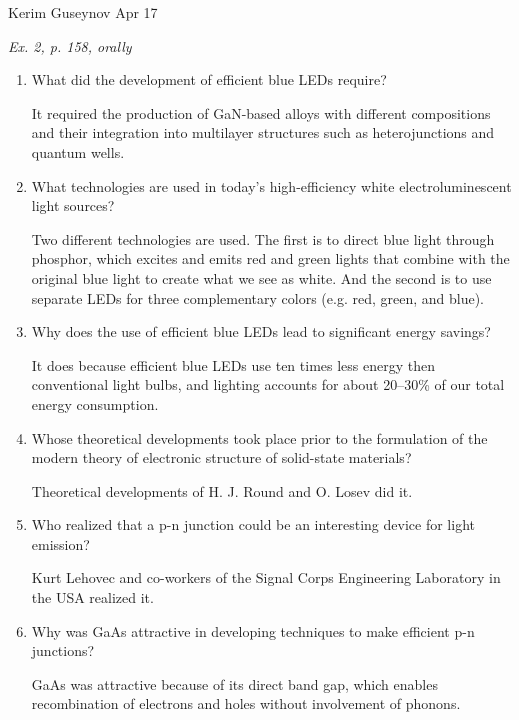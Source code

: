 \documentclass[a4paper, 12pt]{article}
\begin{document}
\noindent
Kerim Guseynov
\hfill
Apr 17

\begin{center}
	\textit{Ex. 2, p. 158, orally}
\end{center}

\begin{enumerate}[label=\alph*)]
	\item What did the development of efficient blue LEDs require?

		It required the production of GaN-based alloys with different 
		compositions and their integration into multilayer structures such 
		as heterojunctions and quantum wells.

	\item What technologies are used in today's high-efficiency white electroluminescent light sources?

		Two different technologies are used. The first is to direct blue 
		light through phosphor, which excites and emits red and green lights 
		that combine with the original blue light to create what we see as 
		white. And the second is to use separate LEDs for three 
		complementary colors (e.g. red, green, and blue).

	\item Why does the use of efficient blue LEDs lead to significant energy savings?

		It does because efficient blue LEDs use ten times less energy then 
		conventional light bulbs, and lighting accounts for about 20--30\% 
		of our total energy consumption.

	\item Whose theoretical developments took place prior to the formulation of the modern theory of electronic structure of solid-state materials?

		Theoretical developments of H. J. Round and O. Losev did it.

	\item Who realized that a p-n junction could be an interesting device for light emission?

		Kurt Lehovec and co-workers of the Signal Corps Engineering 
		Laboratory in the USA realized it.

	\item Why was GaAs attractive in developing techniques to make efficient p-n junctions?

		GaAs was attractive because of its direct band gap, which enables 
		recombination of electrons and holes without involvement of phonons.


\end{enumerate}
\end{document}
